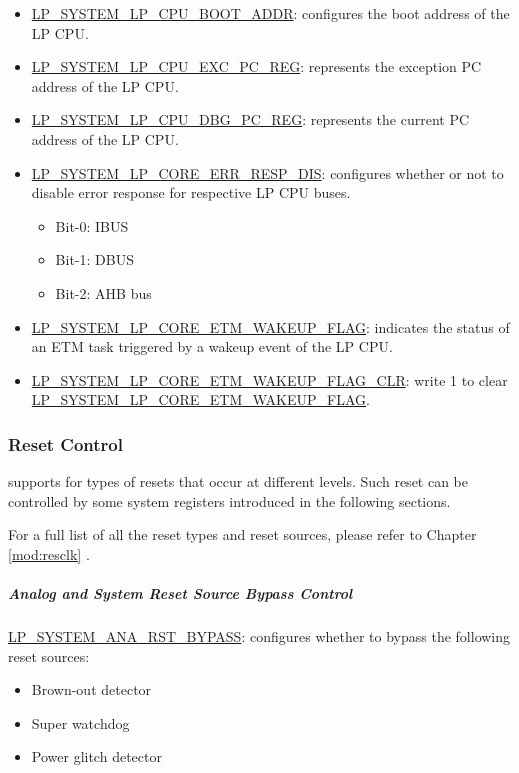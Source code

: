 \documentclass[main\_\_EN.tex]{subfiles}
\begin{document}
\begin{itemize}
    \item \hyperref[fielddesc:LPSYSTEMLPCPUBOOTADDR]{LP\_SYSTEM\_LP\_CPU\_BOOT\_ADDR}: configures the boot address of the LP CPU.
    \item \hyperref[regdesc:LPSYSTEMLPCPUEXCPCREG]{LP\_SYSTEM\_LP\_CPU\_EXC\_PC\_REG}: represents the exception PC address of the LP CPU.
    \item \hyperref[regdesc:LPSYSTEMLPCPUDBGPCREG]{LP\_SYSTEM\_LP\_CPU\_DBG\_PC\_REG}: represents the current PC address of the LP CPU.
    \item \hyperref[fielddesc:LPSYSTEMLPCOREERRRESPDIS]{LP\_SYSTEM\_LP\_CORE\_ERR\_RESP\_DIS}: configures whether or not to disable error response for respective LP CPU buses.
        \begin{itemize}
            \item Bit-0: IBUS
            \item Bit-1: DBUS
            \item Bit-2: AHB bus
        \end{itemize}
    \item \hyperref[fielddesc:LPSYSTEMLPCOREETMWAKEUPFLAG]{LP\_SYSTEM\_LP\_CORE\_ETM\_WAKEUP\_FLAG}: indicates the status of an ETM task triggered by a wakeup event of the LP CPU.
    \item \hyperref[fielddesc:LPSYSTEMLPCOREETMWAKEUPFLAGCLR]{LP\_SYSTEM\_LP\_CORE\_ETM\_WAKEUP\_FLAG\_CLR}: write 1 to clear \hyperref[fielddesc:LPSYSTEMLPCOREETMWAKEUPFLAG]{LP\_SYSTEM\_LP\_CORE\_ETM\_WAKEUP\_FLAG}.
\end{itemize}


\subsubsection{Reset Control}

\chipname{} supports for types of resets that occur at different levels. Such reset can be controlled by some system registers introduced in the following sections.

For a full list of all the reset types and reset sources, please refer to Chapter \ref{mod:resclk} \textit{}.

\subparagraph{Analog and System Reset Source Bypass Control}

\hyperref[fielddesc:LPSYSTEMANARSTBYPASS]{LP\_SYSTEM\_ANA\_RST\_BYPASS}: configures whether to bypass the following reset sources:
\begin{itemize}
    \item Brown-out detector
    \item Super watchdog
    \item Power glitch detector
\end{itemize}
\end{document}
